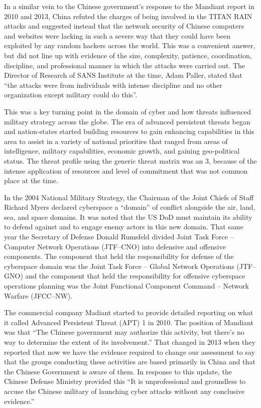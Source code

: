 \documentclass[12pt]{report}
\begin{document}
In a similar vein to the Chinese government's response to the Mandiant report in 2010 and 2013, China refuted the charges of being involved in the TITAN RAIN attacks and suggested instead that the network security of Chinese computers and websites were lacking in such a severe way that they could have been exploited by any random hackers across the world.  This was a convenient answer, but did not line up with evidence of the size, complexity, patience, coordination, discipline, and professional manner in which the attacks were carried out.   The Director of Research of SANS Institute at the time, Adam Paller, stated that “the attacks were from individuals with intense discipline and no other organization except military could do this”.  \cite{titanrain2016}

This was a key turning point in the domain of cyber and how threats influenced military strategy across the globe.  The era of advanced persistent threats began and nation-states started building resources to gain enhancing capabilities in this area to assist in a variety of national priorities that ranged from areas of intelligence, military capabilities, economic growth, and gaining geo-political status.  The threat profile using the generic threat matrix was an 3, because of the intense application of resources and level of commitment that was not common place at the time.

In the 2004 National Military Strategy, the Chairman of the Joint Chiefs of Staff Richard Myers declared cyberspace a “domain” of conflict alongside the air, land, sea, and space domains.  \cite{myers2004national}  It was noted that the US DoD must maintain its ability to defend against and to engage enemy actors in this new domain.  That same year the Secretary of Defense Donald Rumsfeld divided Joint Task Force – Computer Network Operations (JTF–CNO) into defensive and offensive components.  \cite{dod2011strategy}  The component that held the responsibility for defense of the cyberspace domain was the Joint Task Force – Global Network Operations (JTF–GNO) and the component that held the responsibility for offensive cyberspace operations planning was the Joint Functional Component Command – Network Warfare (JFCC–NW).

The commercial company Madiant started to provide detailed reporting on what it called Advanced Persistent Threat (APT) 1 in 2010.  The position of Mandiant was that “The Chinese government may authorize this activity, but there’s no way to determine the extent of its involvement.”  That changed in 2013 when they reported that now we have the evidence required to change our assessment to say that the groups conducting these activities are based primarily in China and that the Chinese Government is aware of them.  \cite{APT1Mandiant2013}  In response to this update, the Chinese Defense Ministry provided this “It is unprofessional and groundless to accuse the Chinese military of launching cyber attacks without any conclusive evidence.”  \cite{lewis2005computer}
\end{document}
